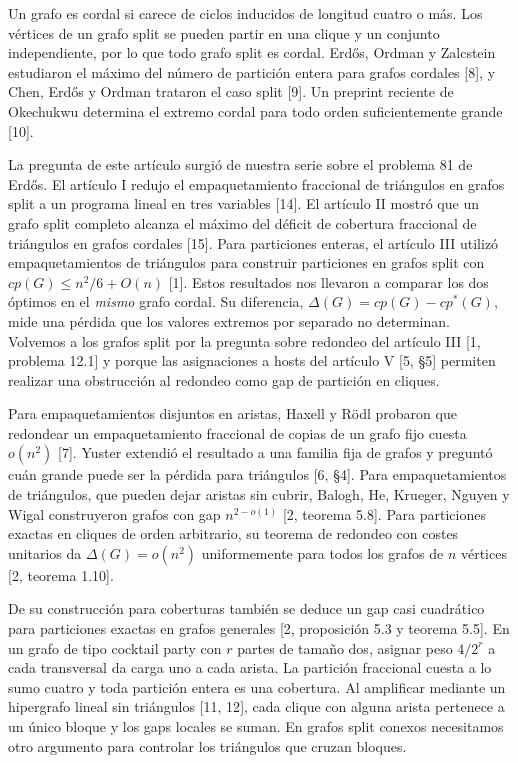 \documentclass[spanish,11pt,a4paper]{article}
\begin{document}
Un grafo es cordal si carece de ciclos inducidos de longitud cuatro o más. Los vértices de un grafo split se pueden partir en una clique y un conjunto independiente, por lo que todo grafo split es cordal. Erdős, Ordman y Zalcstein estudiaron el máximo del número de partición entera para grafos cordales {[}8{]}, y Chen, Erdős y Ordman trataron el caso split {[}9{]}. Un preprint reciente de Okechukwu determina el extremo cordal para todo orden suficientemente grande {[}10{]}.

La pregunta de este artículo surgió de nuestra serie sobre el problema 81 de Erdős. El artículo I redujo el empaquetamiento fraccional de triángulos en grafos split a un programa lineal en tres variables {[}14{]}. El artículo II mostró que un grafo split completo alcanza el máximo del déficit de cobertura fraccional de triángulos en grafos cordales {[}15{]}. Para particiones enteras, el artículo III utilizó empaquetamientos de triángulos para construir particiones en grafos split con \(cp(G)\le n^2/6+O(n)\) {[}1{]}. Estos resultados nos llevaron a comparar los dos óptimos en el \emph{mismo} grafo cordal. Su diferencia, \(\Delta(G)=cp(G)-cp^*(G)\), mide una pérdida que los valores extremos por separado no determinan. Volvemos a los grafos split por la pregunta sobre redondeo del artículo III {[}1, problema 12.1{]} y porque las asignaciones a hosts del artículo V {[}5, §5{]} permiten realizar una obstrucción al redondeo como gap de partición en cliques.

Para empaquetamientos disjuntos en aristas, Haxell y Rödl probaron que redondear un empaquetamiento fraccional de copias de un grafo fijo cuesta \(o(n^2)\) {[}7{]}. Yuster extendió el resultado a una familia fija de grafos y preguntó cuán grande puede ser la pérdida para triángulos {[}6, §4{]}. Para empaquetamientos de triángulos, que pueden dejar aristas sin cubrir, Balogh, He, Krueger, Nguyen y Wigal construyeron grafos con gap \(n^{2-o(1)}\) {[}2, teorema 5.8{]}. Para particiones exactas en cliques de orden arbitrario, su teorema de redondeo con costes unitarios da \(\Delta(G)=o(n^2)\) uniformemente para todos los grafos de \(n\) vértices {[}2, teorema 1.10{]}.

De su construcción para coberturas también se deduce un gap casi cuadrático para particiones exactas en grafos generales {[}2, proposición 5.3 y teorema 5.5{]}. En un grafo de tipo cocktail party con \(r\) partes de tamaño dos, asignar peso \(4/2^r\) a cada transversal da carga uno a cada arista. La partición fraccional cuesta a lo sumo cuatro y toda partición entera es una cobertura. Al amplificar mediante un hipergrafo lineal sin triángulos {[}11, 12{]}, cada clique con alguna arista pertenece a un único bloque y los gaps locales se suman. En grafos split conexos necesitamos otro argumento para controlar los triángulos que cruzan bloques.
\end{document}
